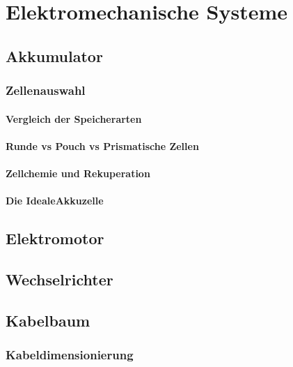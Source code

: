 
\chapter{Elektromechanische Systeme}

\section{Akkumulator}

\subsection{Zellenauswahl}

\subsubsection{Vergleich der Speicherarten}

\subsubsection{Runde vs Pouch vs Prismatische Zellen}

\subsubsection{Zellchemie und Rekuperation}

\subsubsection{Die \glqq Ideale\grqq Akkuzelle}

\section{Elektromotor}

\section{Wechselrichter}

\section{Kabelbaum}

\subsection{Kabeldimensionierung}

